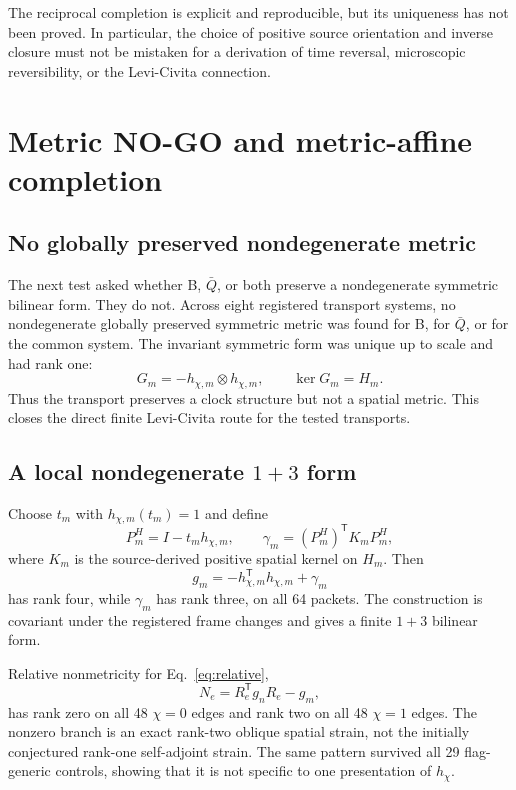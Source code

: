 \documentclass[12pt,a4paper,twoside]{article}
\begin{document}
The reciprocal completion is explicit and reproducible, but its uniqueness has not been proved. In particular, the choice of positive source orientation and inverse closure must not be mistaken for a derivation of time reversal, microscopic reversibility, or the Levi-Civita connection.

\section{Metric NO-GO and metric-affine completion}

\subsection{No globally preserved nondegenerate metric}

The next test asked whether B, $\bar Q$, or both preserve a nondegenerate symmetric bilinear form. They do not. Across eight registered transport systems, no nondegenerate globally preserved symmetric metric was found for B, for $\bar Q$, or for the common system. The invariant symmetric form was unique up to scale and had rank one:
\begin{equation}
G_m=-h_{\chi,m}\otimes h_{\chi,m},
\qquad \ker G_m=H_m.
\label{eq:rankone}
\end{equation}
Thus the transport preserves a clock structure but not a spatial metric. This closes the direct finite Levi-Civita route for the tested transports.

\subsection{A local nondegenerate $1+3$ form}

Choose $t_m$ with $h_{\chi,m}(t_m)=1$ and define
\begin{equation}
P^H_m=I-t_m h_{\chi,m},\qquad
\gamma_m=(P^H_m)^{\mathsf T}K_mP^H_m,
\end{equation}
where $K_m$ is the source-derived positive spatial kernel on $H_m$. Then
\begin{equation}
g_m=-h_{\chi,m}^{\mathsf T}h_{\chi,m}+\gamma_m
\label{eq:localmetric}
\end{equation}
has rank four, while $\gamma_m$ has rank three, on all 64 packets. The construction is covariant under the registered frame changes and gives a finite $1+3$ bilinear form.

Relative nonmetricity for Eq.~\eqref{eq:relative},
\begin{equation}
N_e=R_e^{\mathsf T}g_nR_e-g_m,
\label{eq:nonmetricity}
\end{equation}
has rank zero on all 48 $\chi=0$ edges and rank two on all 48 $\chi=1$ edges. The nonzero branch is an exact rank-two oblique spatial strain, not the initially conjectured rank-one self-adjoint strain. The same pattern survived all 29 flag-generic controls, showing that it is not specific to one presentation of $h_\chi$.
\end{document}
